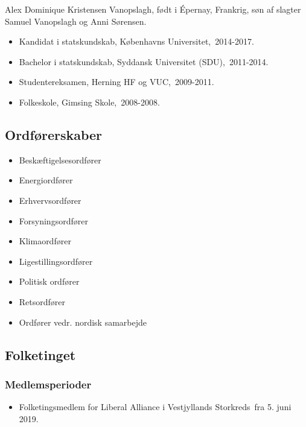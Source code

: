 \documentclass[11pt, a4paper]{awesome-cv}
\begin{document}
\makecvheader[R]
\makelettertitle
\begin{cvletter}
Alex Dominique Kristensen Vanopslagh, født i Épernay, Frankrig, søn af slagter Samuel Vanopslagh og Anni Sørensen.

\begin{itemize}
\item Kandidat i statskundskab, Københavns Universitet, 2014-2017.
\item Bachelor i statskundskab, Syddansk Universitet (SDU), 2011-2014.
\item Studentereksamen, Herning HF og VUC, 2009-2011.
\item Folkeskole, Gimsing Skole, 2008-2008.
\end{itemize}
\subsection*{Ordførerskaber}
\begin{itemize}
\item Beskæftigelsesordfører
\item Energiordfører
\item Erhvervsordfører
\item Forsyningsordfører
\item Klimaordfører
\item Ligestillingsordfører
\item Politisk ordfører
\item Retsordfører
\item Ordfører vedr. nordisk samarbejde
\end{itemize}
\subsection*{Folketinget}
\subsubsection*{Medlemsperioder}
\begin{itemize}
\item Folketingsmedlem for Liberal Alliance i Vestjyllands Storkreds fra 5. juni 2019.
\end{itemize}

\end{cvletter}
\end{document}
